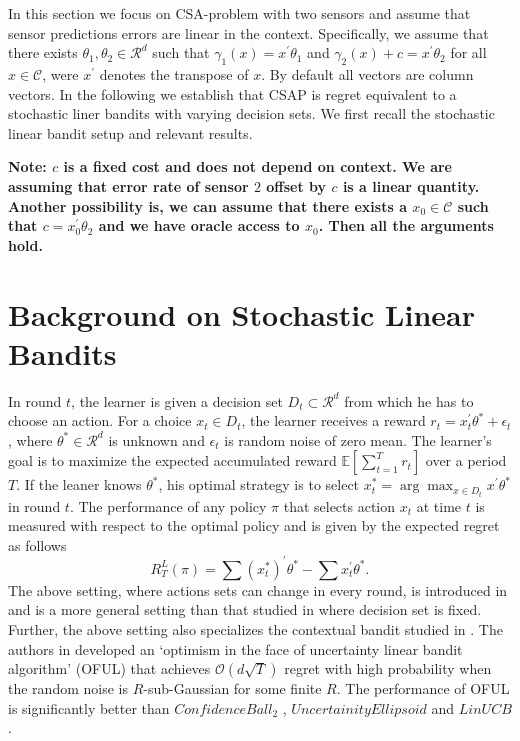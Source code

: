 \documentclass{article}
\begin{document}
In this section we focus on CSA-problem with two sensors and assume that sensor predictions errors are linear in the context. Specifically, we assume that there exists $\theta_1, \theta_2 \in \mathcal{R}^d$ such that $\gamma_1(x)=x^\prime\theta_1$ and $\gamma_2(x)+c=x^\prime\theta_2$ for all $x \in \mathcal{C}$, were $x^\prime$ denotes the transpose of $x$. By default all vectors are column vectors. In the following we establish that CSAP is regret equivalent to a stochastic liner bandits with varying decision sets. We first recall the stochastic linear bandit setup and relevant results. 

\noindent
{\bf Note: $c$ is a fixed cost and does not depend on context. We are assuming that error rate of sensor $2$ offset by $c$ is a linear quantity. Another possibility is, we can assume that there exists a $x_0 \in \mathcal{C}$ such that $c=x_0^\prime \theta_2 $ and we have oracle access to $x_0$. Then all the arguments hold.} 

\section{Background on Stochastic Linear Bandits}
In round $t$, the learner is given a decision set $D_t \subset \mathcal{R}^d$ from which he has to choose an action. For a choice $x_t \in D_t$, the learner receives a reward $r_t=x_t^\prime\theta^* + \epsilon_t$, where $\theta^* \in \mathcal{R}^d$ is unknown and $\epsilon_t$ is random noise of zero mean. The learner's goal  is to maximize the expected accumulated reward $\mathbb{E}\left[\sum_{t=1}^{T} r_t \right]$ over a period $T$. If the leaner knows $\theta^*$, his optimal strategy is to select $x_t^*=\arg \max_{x \in D_t} x^\prime \theta^* $ in round $t$. The performance of any policy $\pi$ that selects action $x_t$ at time $t$ is 
measured with respect to the optimal policy and is given by the expected regret  as follows
\begin{equation}
\label{eqn:LinearBanditRegret}
R^L_T(\pi)= \sum (x_t^*)^\prime \theta^* - \sum x_t^\prime \theta^* .
\end{equation}
The above setting, where actions sets can change in every round, is introduced in\cite{NIPS2011_ImprovedAlgorithms_AbbasiPalSzepes} and is a more general setting than that studied in \cite{COLT08_StochasticLinearOptimization_DaniHayesKakad,MOR11_LinearlyParametrized_RusmevichientongTsitsiklis} where decision set is fixed. Further, the above setting also specializes the contextual bandit studied in \cite{WWW10_Contextaulbandits_LiChuWei}. The authors in \cite{NIPS2011_ImprovedAlgorithms_AbbasiPalSzepes} developed an
`optimism in the face of uncertainty linear bandit algorithm' (OFUL) that achieves $\mathcal{O}(d \sqrt{T})$ regret with high probability when the random noise is $R$-sub-Gaussian for some finite $R$. The performance of OFUL is significantly better than $ConfidenceBall_2$ \cite{COLT08_StochasticLinearOptimization_DaniHayesKakad}, $UncertainityEllipsoid$ \cite{MOR11_LinearlyParametrized_RusmevichientongTsitsiklis}
and $LinUCB$ \cite{WWW10_Contextaulbandits_LiChuWei}. 
\end{document}
